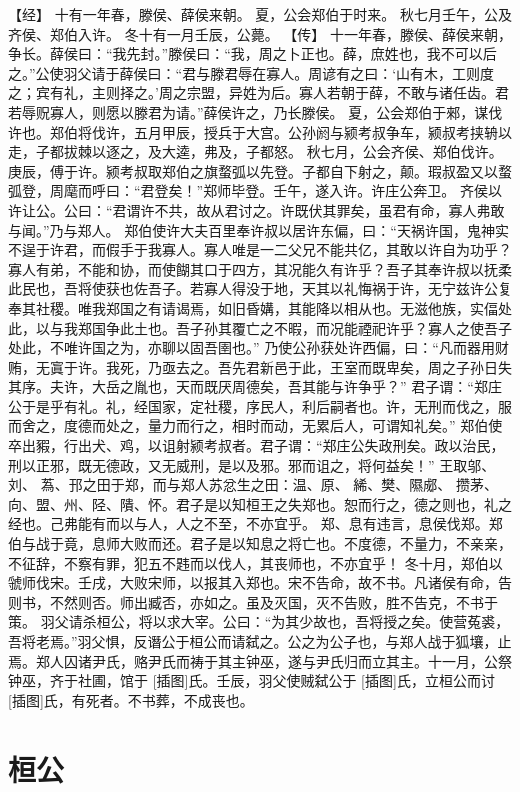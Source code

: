 \documentclass[a4paper,12pt,UTF8,twoside]{ctexbook}
\begin{document}
【经】
十有一年春，滕侯、薛侯来朝。
夏，公会郑伯于时来。
秋七月壬午，公及齐侯、郑伯入许。
冬十有一月壬辰，公薨。
【传】
十一年春，滕侯、薛侯来朝，争长。薛侯曰：“我先封。”滕侯曰：“我，周之卜正也。薛，庶姓也，我不可以后之。”公使羽父请于薛侯曰：“君与滕君辱在寡人。周谚有之曰：‘山有木，工则度之；宾有礼，主则择之。’周之宗盟，异姓为后。寡人若朝于薛，不敢与诸任齿。君若辱贶寡人，则愿以滕君为请。”薛侯许之，乃长滕侯。
夏，公会郑伯于郲，谋伐许也。郑伯将伐许，五月甲辰，授兵于大宫。公孙阏与颍考叔争车，颍叔考挟辀以走，子都拔棘以逐之，及大逵，弗及，子都怒。
秋七月，公会齐侯、郑伯伐许。庚辰，傅于许。颍考叔取郑伯之旗蝥弧以先登。子都自下射之，颠。瑕叔盈又以蝥弧登，周麾而呼曰：“君登矣！”郑师毕登。壬午，遂入许。许庄公奔卫。
齐侯以许让公。公曰：“君谓许不共，故从君讨之。许既伏其罪矣，虽君有命，寡人弗敢与闻。”乃与郑人。
郑伯使许大夫百里奉许叔以居许东偏，曰：“天祸许国，鬼神实不逞于许君，而假手于我寡人。寡人唯是一二父兄不能共亿，其敢以许自为功乎？寡人有弟，不能和协，而使餬其口于四方，其况能久有许乎？吾子其奉许叔以抚柔此民也，吾将使获也佐吾子。若寡人得没于地，天其以礼悔祸于许，无宁兹许公复奉其社稷。唯我郑国之有请谒焉，如旧昏媾，其能降以相从也。无滋他族，实偪处此，以与我郑国争此土也。吾子孙其覆亡之不暇，而况能禋祀许乎？寡人之使吾子处此，不唯许国之为，亦聊以固吾圉也。”
乃使公孙获处许西偏，曰：“凡而器用财贿，无寘于许。我死，乃亟去之。吾先君新邑于此，王室而既卑矣，周之子孙日失其序。夫许，大岳之胤也，天而既厌周德矣，吾其能与许争乎？”
君子谓：“郑庄公于是乎有礼。礼，经国家，定社稷，序民人，利后嗣者也。许，无刑而伐之，服而舍之，度德而处之，量力而行之，相时而动，无累后人，可谓知礼矣。”
郑伯使卒出豭，行出犬、鸡，以诅射颍考叔者。君子谓：“郑庄公失政刑矣。政以治民，刑以正邪，既无德政，又无威刑，是以及邪。邪而诅之，将何益矣！”
王取邬、刘、 蒍、邘之田于郑，而与郑人苏忿生之田：温、原、 絺、樊、隰郕、 攒茅、向、盟、州、陉、隤、怀。君子是以知桓王之失郑也。恕而行之，德之则也，礼之经也。己弗能有而以与人，人之不至，不亦宜乎。
郑、息有违言，息侯伐郑。郑伯与战于竟，息师大败而还。君子是以知息之将亡也。不度德，不量力，不亲亲，不征辞，不察有罪，犯五不韪而以伐人，其丧师也，不亦宜乎！
冬十月，郑伯以虢师伐宋。壬戌，大败宋师，以报其入郑也。宋不告命，故不书。凡诸侯有命，告则书，不然则否。师出臧否，亦如之。虽及灭国，灭不告败，胜不告克，不书于策。
羽父请杀桓公，将以求大宰。公曰：“为其少故也，吾将授之矣。使营菟裘，吾将老焉。”羽父惧，反谮公于桓公而请弑之。公之为公子也，与郑人战于狐壤，止焉。郑人囚诸尹氏，赂尹氏而祷于其主钟巫，遂与尹氏归而立其主。十一月，公祭钟巫，齐于社圃，馆于 [插图]氏。壬辰，羽父使贼弑公于 [插图]氏，立桓公而讨 [插图]氏，有死者。不书葬，不成丧也。

\part{桓公}
\end{document}
